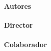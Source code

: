 {\vfill

\begin{large}
\begin{center}
\textoPrimerSubtituloPortadaVal
\mbox{ } \\ \mbox{ } \\
{\Large \bfseries Autores}\\
\textbf{\autorPortadaVal}\\[1.0cm]
{\Large \bfseries Director}\\
\textbf{\directorPortadaVal}\\[0.3cm]
\ifx\colaboradorPortadaVal\empty\else
{\Large \bfseries Colaborador}\\
\textbf{\colaboradorPortadaVal}\\[0.3cm]
\fi
\mbox{ } \\ \mbox{ } \\
\textoSegundoSubtituloPortadaVal \\ [0.3em]
\end{center}
\end{large}

\vfill

\begin{large}
\begin{center}
\textbf{\institucionVal}\\[0.2em]
    \mbox{ }  \\
\textbf{\fechaPublicacionVal}
\end{center}
\end{large}


\newpage
\thispagestyle{empty}
%

} %

